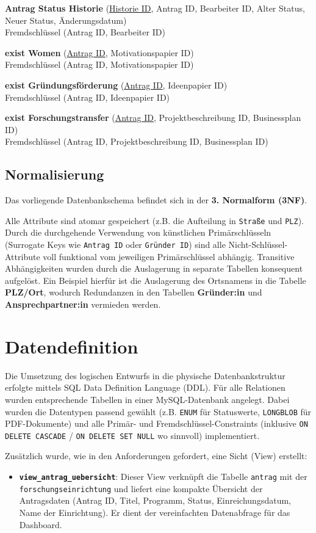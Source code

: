 \documentclass{article}
\begin{document}
\textbf{Antrag Status Historie} (\underline{Historie ID}, Antrag ID, Bearbeiter ID, Alter Status, Neuer Status, Änderungsdatum)\\
Fremdschlüssel (Antrag ID, Bearbeiter ID)

\textbf{exist Women} (\underline{Antrag ID}, Motivationspapier ID)\\
Fremdschlüssel (Antrag ID, Motivationspapier ID)

\textbf{exist Gründungsförderung} (\underline{Antrag ID}, Ideenpapier ID)\\
Fremdschlüssel (Antrag ID, Ideenpapier ID)

\textbf{exist Forschungstransfer} (\underline{Antrag ID}, Projektbeschreibung ID, Businessplan ID)\\
Fremdschlüssel (Antrag ID, Projektbeschreibung ID, Businessplan ID)

\subsection{Normalisierung}
Das vorliegende Datenbankschema befindet sich in der \textbf{3. Normalform (3NF)}. 

Alle Attribute sind atomar gespeichert (z.B. die Aufteilung in \texttt{Straße} und \texttt{PLZ}). Durch die durchgehende Verwendung von künstlichen Primärschlüsseln (Surrogate Keys wie \texttt{Antrag ID} oder \texttt{Gründer ID}) sind alle Nicht-Schlüssel-Attribute voll funktional vom jeweiligen Primärschlüssel abhängig. Transitive Abhängigkeiten wurden durch die Auslagerung in separate Tabellen konsequent aufgelöst. Ein Beispiel hierfür ist die Auslagerung des Ortsnamens in die Tabelle \textbf{PLZ/Ort}, wodurch Redundanzen in den Tabellen \textbf{Gründer:in} und \textbf{Ansprechpartner:in} vermieden werden.


\newpage
\section{Datendefinition}
Die Umsetzung des logischen Entwurfs in die physische Datenbankstruktur erfolgte mittels SQL Data Definition Language (DDL). Für alle Relationen wurden entsprechende Tabellen in einer MySQL-Datenbank angelegt. Dabei wurden die Datentypen passend gewählt (z.B. \texttt{ENUM} für Statuswerte, \texttt{LONGBLOB} für PDF-Dokumente) und alle Primär- und Fremdschlüssel-Constraints (inklusive \texttt{ON DELETE CASCADE} / \texttt{ON DELETE SET NULL} wo sinnvoll) implementiert.

Zusätzlich wurde, wie in den Anforderungen gefordert, eine Sicht (View) erstellt:
\begin{itemize}
    \item \textbf{\texttt{view\_antrag\_uebersicht}}: Dieser View verknüpft die Tabelle \texttt{antrag} mit der \texttt{forschungseinrichtung} und liefert eine kompakte Übersicht der Antragsdaten (Antrag ID, Titel, Programm, Status, Einreichungsdatum, Name der Einrichtung). Er dient der vereinfachten Datenabfrage für das Dashboard.
\end{itemize}
\end{document}
